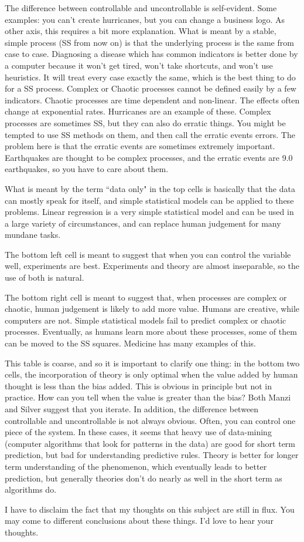 \documentclass[11pt, oneside]{article}   	%
\begin{document}
The difference between controllable and uncontrollable is self-evident.  Some examples: you can't create hurricanes, but you can change a business logo.  As other axis, this requires a bit more explanation.  What is meant by a stable, simple process (SS from now on) is that the underlying process is the same from case to case.  Diagnosing a disease which has common indicators is better done by a computer because it won't get tired, won't take shortcuts, and won't use heuristics.  It will treat every case exactly the same, which is the best thing to do for a SS process.   Complex or Chaotic processes  cannot be defined easily by a few indicators.  Chaotic processes are time dependent and non-linear.  The effects often change at exponential rates.  Hurricanes are an example of these.  Complex processes are sometimes SS, but they can also do erratic things.  You might be tempted to use SS methods on them, and then call the erratic events errors.  The problem here is that the erratic events are sometimes extremely important.  Earthquakes are thought to be complex processes, and the erratic events are 9.0 earthquakes, so you have to care about them.   
 
 What is meant by the term ``data only" in the top cells is basically that the data can mostly speak for itself, and simple statistical models can be applied to these problems.  Linear regression is a very simple statistical model and can be used in a large variety of circumstances, and can replace human judgement for many mundane tasks.
 
The bottom left cell is meant to suggest that when you can control the variable well, experiments are best.  Experiments and theory are almost inseparable, so the use of both is natural.  

The bottom right cell is meant to suggest that, when processes are complex or chaotic, human judgement is likely to add more value.  Humans are creative, while computers are not.  Simple statistical models fail to predict complex or chaotic processes.  Eventually, as humans learn more about these processes, some of them can be moved to the SS squares.  Medicine has many examples of this.  

This table is coarse, and so it is important to clarify one thing: in the bottom two cells, the incorporation of theory is only optimal when the value added by human thought is less than the bias added.  This is obvious in principle but not in practice.  How can you tell when the value is greater than the bias?  Both Manzi and Silver suggest that you iterate.  In addition, the difference between controllable and uncontrollable is not always obvious.  Often, you can control one piece of the system.  In these cases, it seems that heavy use of data-mining (computer algorithms that look for patterns in the data) are good for short term prediction, but bad for understanding predictive rules.  Theory is better for longer term understanding of the phenomenon, which eventually leads to better prediction, but generally theories don't do nearly as well in the short term as algorithms do.  

I have to disclaim the fact that my thoughts on this subject are still in flux.  You may come to different conclusions about these things.  I'd love to hear your thoughts.
  
\end{document}
